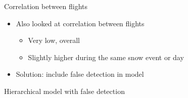 \documentclass{beamer}
\begin{document}
\begin{frame}{Correlation between flights}
	\begin{center}
	\end{center}
	\begin{itemize}
		\item Also looked at correlation between flights
		\begin{itemize}
			\item Very low, overall
			\item Slightly higher during the same snow event or day
		\end{itemize}
		\item Solution: include false detection in model
	\end{itemize}
\end{frame}

\begin{frame}{Hierarchical model with false detection}
	\begin{center}
	\end{center}
\end{frame}
\end{document}
